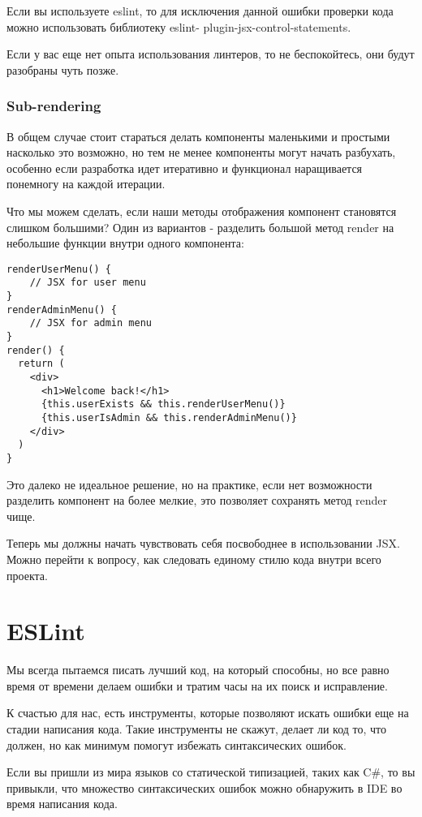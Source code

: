 Если вы используете eslint, то для исключения данной ошибки проверки кода можно использовать библиотеку eslint- plugin-jsx-control-statements.

Если у вас еще нет опыта использования линтеров, то не беспокойтесь, они будут разобраны чуть позже. 

\subsubsection{Sub-rendering}

В общем случае стоит стараться делать компоненты маленькими и простыми насколько это возможно, но тем не менее компоненты могут начать разбухать, особенно если разработка идет итеративно и функционал наращивается понемногу на каждой итерации.

Что мы можем сделать, если наши методы отображения компонент становятся слишком большими? Один из вариантов - разделить большой метод render на небольшие функции внутри одного компонента:

\begin{lstlisting}
renderUserMenu() {
    // JSX for user menu
}
renderAdminMenu() {
    // JSX for admin menu
}
render() {
  return (
    <div>
      <h1>Welcome back!</h1>
      {this.userExists && this.renderUserMenu()}
      {this.userIsAdmin && this.renderAdminMenu()}
    </div> 
  )
}
\end{lstlisting}

Это далеко не идеальное решение, но на практике, если нет возможности разделить компонент на более мелкие, это позволяет сохранять метод render чище.

Теперь мы должны начать чувствовать себя посвободнее в использовании JSX. Можно перейти к вопросу, как следовать единому стилю кода внутри всего проекта.

\section{ESLint}

Мы всегда пытаемся писать лучший код, на который способны, но все равно время от времени делаем ошибки и тратим часы на их поиск и исправление.

К счастью для нас, есть инструменты, которые позволяют искать ошибки еще на стадии написания кода. Такие инструменты не скажут, делает ли код то, что должен, но как минимум помогут избежать синтаксических ошибок.

Если вы пришли из мира языков со статической типизацией, таких как C\#, то вы привыкли, что множество синтаксических ошибок можно обнаружить в IDE во время написания кода.

